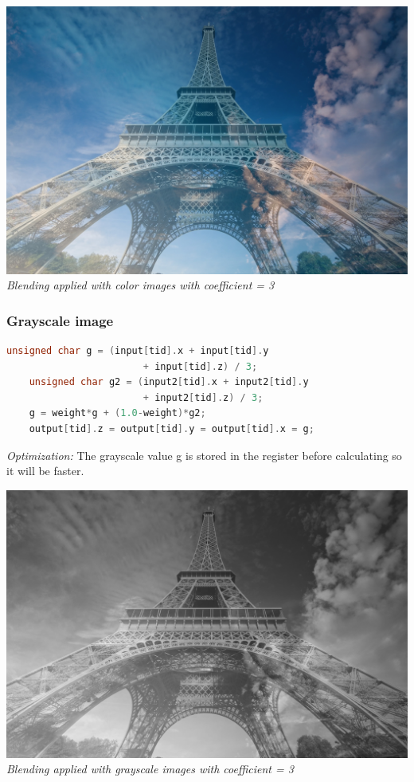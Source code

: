 \documentclass{article}
\begin{document}
\begin{center}
    \includegraphics[width=\linewidth]{blendingrgb.jpg}
    \\
    \textit{Blending applied with color images with coefficient = 3}
\end{center}

\subsubsection{Grayscale image}
\begin{lstlisting}[language=C]
    unsigned char g = (input[tid].x + input[tid].y 
                        + input[tid].z) / 3;
    unsigned char g2 = (input2[tid].x + input2[tid].y 
	                    + input2[tid].z) / 3;
	g = weight*g + (1.0-weight)*g2;
    output[tid].z = output[tid].y = output[tid].x = g; 
\end{lstlisting}
\textit{Optimization:} The grayscale value g is stored in the register before calculating so it will be faster.
\\

\begin{center}
    \includegraphics[width=\linewidth]{blendinggray.jpg}
    \\
    \textit{Blending applied with grayscale images with coefficient = 3}
\end{center}
\end{document}
